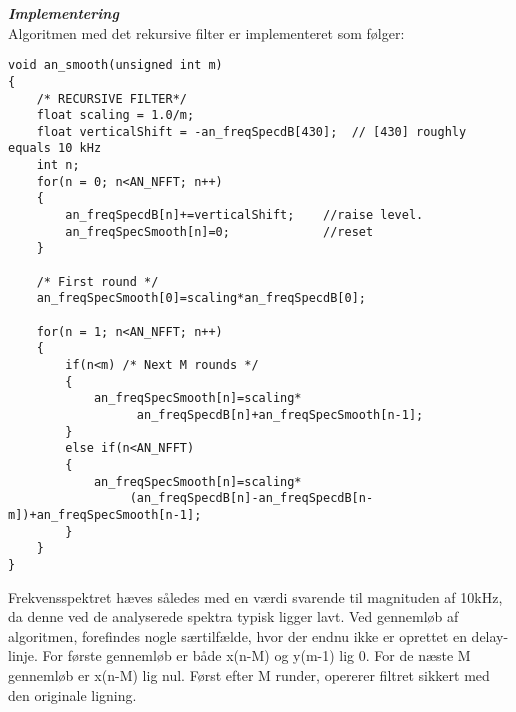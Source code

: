 \textbf{\textit{Implementering}} \\
Algoritmen med det rekursive filter er implementeret som følger:
\begin{verbatim}void an_smooth(unsigned int m)
{
    /* RECURSIVE FILTER*/
    float scaling = 1.0/m;
    float verticalShift = -an_freqSpecdB[430];	// [430] roughly equals 10 kHz
    int n;
    for(n = 0; n<AN_NFFT; n++)
    {
        an_freqSpecdB[n]+=verticalShift;    //raise level.
        an_freqSpecSmooth[n]=0;             //reset
    }

    /* First round */
    an_freqSpecSmooth[0]=scaling*an_freqSpecdB[0];

    for(n = 1; n<AN_NFFT; n++)
    {
        if(n<m)	/* Next M rounds */
        {
            an_freqSpecSmooth[n]=scaling*
                  an_freqSpecdB[n]+an_freqSpecSmooth[n-1];
        }
        else if(n<AN_NFFT)
        {
            an_freqSpecSmooth[n]=scaling*
                 (an_freqSpecdB[n]-an_freqSpecdB[n-m])+an_freqSpecSmooth[n-1];
        }
    }
}\end{verbatim}
Frekvensspektret hæves således med en værdi svarende til magnituden af 10kHz, da denne ved de analyserede spektra typisk ligger lavt. Ved gennemløb af algoritmen, forefindes nogle særtilfælde, hvor der endnu ikke er oprettet en delay-linje. For første gennemløb er både x(n-M) og y(m-1) lig 0. For de næste M gennemløb er x(n-M) lig nul. Først efter M runder, opererer filtret sikkert med den originale ligning.